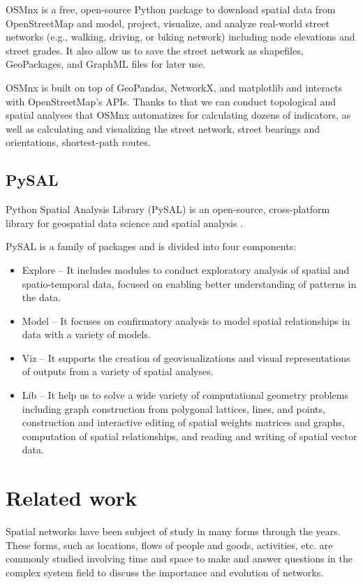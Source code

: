 OSMnx \cite{boeing_osmnx_2017} is a free, open-source Python package to download spatial data from OpenStreetMap and model, project, visualize, and analyze real-world street networks (e.g., walking, driving, or biking network) including node elevations and street grades. It also allow us to save the street network as shapefiles, GeoPackages, and GraphML files for later use.

OSMnx is built on top of GeoPandas, NetworkX, and matplotlib and interacts with OpenStreetMap's APIs. Thanks to that we can conduct topological and spatial analyses that OSMnx automatizes for calculating dozens of indicators, as well as calculating and visualizing the street network, street bearings and orientations, shortest-path routes.


\subsection{PySAL}

Python Spatial Analysis Library (PySAL) is an open-source, cross-platform library for geospatial data science and spatial analysis \cite{pysal2007}.

PySAL is a family of packages and is divided into four components:

\begin{itemize}
	\item Explore -- It includes modules to conduct exploratory analysis of spatial and spatio-temporal data, focused on enabling better understanding of patterns in the data.
	\item Model -- It focuses on confirmatory analysis to model spatial relationships in data with a variety of models.
	\item Viz -- It supports the creation of geovisualizations and visual representations of outputs from a variety of spatial analyses. 
	\item Lib -- It help us to solve a wide variety of computational geometry problems including graph construction from polygonal lattices, lines, and points, construction and interactive editing of spatial weights matrices and graphs, computation of spatial relationships, and reading and writing of spatial vector data.
\end{itemize}

\section{Related work}

Spatial networks have been subject of study in many forms through the years. These forms, such as locations, flows of people and goods, activities, etc. are commonly studied involving time and space to make and answer questions in the complex system field to discuss the importance and evolution of networks.

